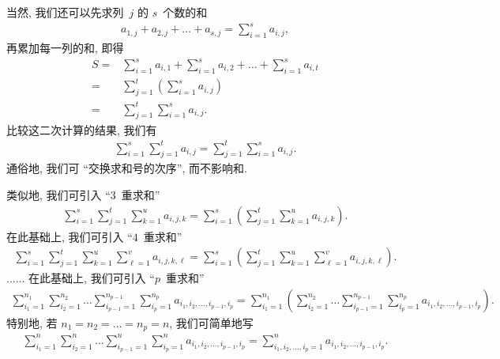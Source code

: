 当然, 我们还可以先求列~\(j\) 的 \(s\)~个数的和
\begin{align*}
    a_{1,j} + a_{2,j} + \dots + a_{s,j}
    = \sum_{i = 1}^{s} {a_{i,j}},
\end{align*}
再累加每一列的和, 即得
\begin{align*}
    S
    = {} & \sum_{i = 1}^{s} {a_{i,1}}
    + \sum_{i = 1}^{s} {a_{i,2}}
    + \dots
    + \sum_{i = 1}^{s} {a_{i,t}}
    \\
    = {} &
    \sum_{j = 1}^{t}
    {\left( \sum_{i = 1}^{s} {a_{i,j}} \right)}
    \\
    = {} &
    \sum_{j = 1}^{t} {
    \sum_{i = 1}^{s} {a_{i,j}}}.
\end{align*}
比较这二次计算的结果, 我们有
\begin{align*}
    \sum_{i = 1}^{s} {\sum_{j = 1}^{t} {a_{i,j}}}
    = \sum_{j = 1}^{t} {\sum_{i = 1}^{s} {a_{i,j}}}.
\end{align*}
通俗地, 我们可 ``交换求和号的次序'', 而不影响和.

类似地, 我们可引入 ``\(3\)~重求和''
\begin{align*}
    \sum_{i = 1}^{s} {
    \sum_{j = 1}^{t} {
    \sum_{k = 1}^{u} {
    a_{i,j,k}}}}
    =
    \sum_{i = 1}^{s}
    {\left( \sum_{j = 1}^{t} {
        \sum_{k = 1}^{u} {
            a_{i,j,k} }} \right)}.
\end{align*}
在此基础上, 我们可引入 ``\(4\)~重求和''
\begin{align*}
    \sum_{i = 1}^{s} {
    \sum_{j = 1}^{t} {
    \sum_{k = 1}^{u} {
    \sum_{\ell = 1}^{v} {
    a_{i,j,k,\ell} }}}}
    =
    \sum_{i = 1}^{s}
    {\left(
    \sum_{j = 1}^{t} {
        \sum_{k = 1}^{u} {
            \sum_{\ell = 1}^{v} {
                a_{i,j,k,\ell} }}}
    \right)}.
\end{align*}
\(\dots \dots\)
在此基础上, 我们可引入 ``\(p\)~重求和''
\begin{align*}
    \sum_{i_1 = 1}^{n_1} {
    \sum_{i_2 = 1}^{n_2} {
    \dots
    \sum_{i_{p-1} = 1}^{n_{p-1}} {
    \sum_{i_p = 1}^{n_p} {
    a_{i_1,i_2,\dots,i_{p-1},i_p} }}}}
    = \sum_{i_1 = 1}^{n_1}
    {\left(
    \sum_{i_2 = 1}^{n_2} {
        \dots
        \sum_{i_{p-1} = 1}^{n_{p-1}} {
            \sum_{i_p = 1}^{n_p} {
                a_{i_1,i_2,\dots,i_{p-1},i_p}}}}
    \right)}.
\end{align*}
特别地, 若 \(n_1 = n_2 = \dots = n_p = n\),
我们可简单地写
\begin{align*}
    \sum_{i_1 = 1}^{n} {
    \sum_{i_2 = 1}^{n} {
    \dots
    \sum_{i_{p-1} = 1}^{n} {
    \sum_{i_p = 1}^{n} {
    a_{i_1,i_2,\dots,i_{p-1},i_p} }}}}
    =
    \sum_{i_1,i_2,\dots,i_p = 1}^{n}
    {a_{i_1,i_2,\dots,i_{p-1},i_p}}.
\end{align*}

